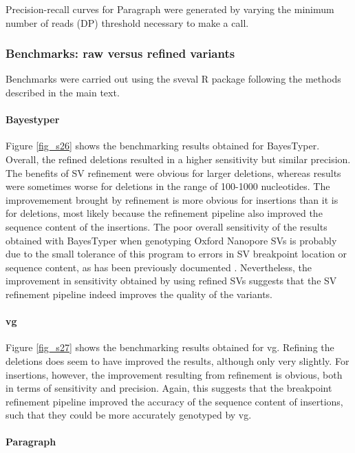 \documentclass[12pt]{article}
\begin{document}
Precision-recall curves for Paragraph were generated by varying the minimum number of reads (DP) threshold necessary to make a call.

\subsubsection{Benchmarks: raw versus refined variants}

Benchmarks were carried out using the sveval R package \citep[][\url{https://github.com/jmonlong/sveval}]{vg} following the methods described in the main text.

\paragraph{Bayestyper}

Figure \ref{fig_s26} shows the benchmarking results obtained for BayesTyper.
Overall, the refined deletions resulted in a higher sensitivity but similar precision. 
The benefits of SV refinement were obvious for larger deletions, whereas results were sometimes worse for deletions in the range of 100-1000 nucleotides.
The improvemement brought by refinement is more obvious for insertions than it is for deletions, most likely because the refinement pipeline also improved the sequence content of the insertions.
The poor overall sensitivity of the results obtained with BayesTyper when genotyping Oxford Nanopore SVs is probably due to the small tolerance of this program to errors in SV breakpoint location or sequence content, as has been previously documented \citep{vg}.
Nevertheless, the improvement in sensitivity obtained by using refined SVs suggests that the SV refinement pipeline indeed improves the quality of the variants.

\paragraph{vg}

Figure \ref{fig_s27} shows the benchmarking results obtained for vg.
Refining the deletions does seem to have improved the results, although only very slightly.
For insertions, however, the improvement resulting from refinement is obvious, both in terms of sensitivity and precision.
Again, this suggests that the breakpoint refinement pipeline improved the accuracy of the sequence content of insertions, such that they could be more accurately genotyped by vg.

\paragraph{Paragraph}
\end{document}
